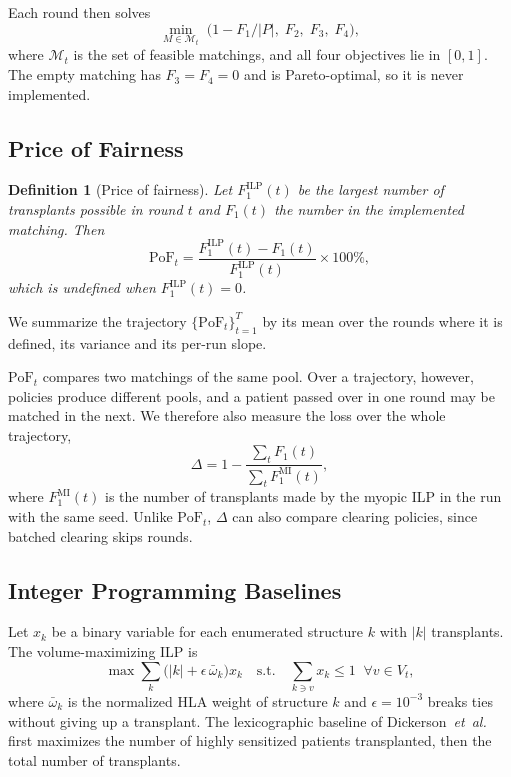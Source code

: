 \documentclass[journal]{IEEEtran}
\newtheorem{definition}{Definition}
\newcommand{\pof}{\ensuremath{\mathrm{PoF}_t}}
\newcommand{\ilp}{\ensuremath{\mathrm{ILP}}}
\begin{document}
Each round then solves
\begin{equation}
  \min_{M \in \mathcal{M}_t} \;
  \bigl( 1 - F_1/|P|,\; F_2,\; F_3,\; F_4 \bigr) ,
  \label{eq:mop}
\end{equation}
where $\mathcal{M}_t$ is the set of feasible matchings, and all four
objectives lie in $[0,1]$. The empty matching has $F_3 = F_4 = 0$ and
is Pareto-optimal, so it is never implemented.

\subsection{Price of Fairness}
\label{sec:problem:pof}

\begin{definition}[Price of fairness]
Let $F_1^{\ilp}(t)$ be the largest number of transplants possible in
round $t$ and $F_1(t)$ the number in the implemented matching. Then
\begin{equation}
  \pof = \frac{F_1^{\ilp}(t) - F_1(t)}{F_1^{\ilp}(t)} \times 100\% ,
  \label{eq:pof}
\end{equation}
which is undefined when $F_1^{\ilp}(t) = 0$.
\end{definition}
We summarize the trajectory $\{\pof\}_{t=1}^{T}$ by its mean over the
rounds where it is defined, its variance and its per-run slope.

$\pof$ compares two matchings of the same pool. Over a trajectory,
however, policies produce different pools, and a patient passed over
in one round may be matched in the next. We therefore also measure
the loss over the whole trajectory,
\begin{equation}
  \Delta = 1 - \frac{\sum_t F_1(t)}{\sum_t F_1^{\mathrm{MI}}(t)} ,
  \label{eq:delta}
\end{equation}
where $F_1^{\mathrm{MI}}(t)$ is the number of transplants made by the
myopic ILP in the run with the same seed. Unlike $\pof$, $\Delta$ can
also compare clearing policies, since batched clearing skips rounds.

\subsection{Integer Programming Baselines}
\label{sec:problem:ilp}

Let $x_k$ be a binary variable for each enumerated structure $k$ with
$|k|$ transplants. The volume-maximizing ILP is
\begin{equation}
  \max \sum_k \bigl(|k| + \epsilon\, \bar\omega_k\bigr) x_k
  \quad \text{s.t.} \quad
  \sum_{k \ni v} x_k \leq 1 \;\; \forall v \in V_t ,
  \label{eq:ilp}
\end{equation}
where $\bar\omega_k$ is the normalized HLA weight of structure $k$ and
$\epsilon = 10^{-3}$ breaks ties without giving up a transplant. The
lexicographic baseline of
Dickerson~\textit{et~al.}~\cite{dickerson2014price} first maximizes
the number of highly sensitized patients transplanted, then the total
number of transplants.
\end{document}
